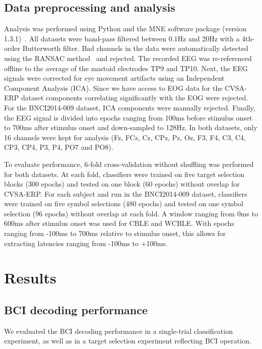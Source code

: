 \subsection{Data preprocessing and analysis}
Analysis was performed using Python and the MNE software package (version
1.3.1)~\cite{Gramfort2013}.
All datasets were band-pass filtered between 0.1Hz and 20Hz with a 4th-order Butterworth filter.
Bad channels in the data were automatically detected using the RANSAC
method~\cite{Fischler1981} and rejected.
The recorded EEG was re-referenced
offline to the average of the mastoid electrodes TP9 and TP10.
Next, the EEG signals were corrected for eye movement artifacts using an
Independent Component Analysis (ICA).
Since we have access to EOG data for the CVSA-ERP dataset components correlating
significantly with the EOG were rejected.
For the BNCI2014-009 dataset, ICA components were manually rejected.
Finally, the EEG signal is divided into epochs ranging from 100ms before stimulus onset to 700ms after stimulus onset and down-sampled to 128Hz.
In both datasets, only 16 channels were kept for
analysis (Fz, FCz, Cz, CPz, Pz, Oz, F3, F4, C3, C4, CP3, CP4, P3, P4, PO7 and
PO8).

To evaluate performance, 6-fold cross-validation without shuffling was performed for both
datasets.
At each fold, classifiers were trained on five target selection blocks (300
epochs) and tested on one block (60 epochs) without overlap for CVSA-ERP.
For each subject and run in the BNCI2014-009 dataset, classifiers
were trained on five symbol selections (480 epochs) and tested on one symbol
selection (96 epochs) without overlap at each fold.
A window ranging from 0ms to 600ms after stimulus onset was used for CBLE and WCBLE.
With epochs ranging from -100ms to 700ms relative to stimulus onset, this
allows for extracting latencies ranging from -100ms to +100ms.
\section{Results}

\subsection{BCI decoding performance}
\label{sec:block_accuracy}

We evaluated the BCI decoding performance in a single-trial classification
experiment, as well as in a target selection experiment reflecting BCI
operation.

